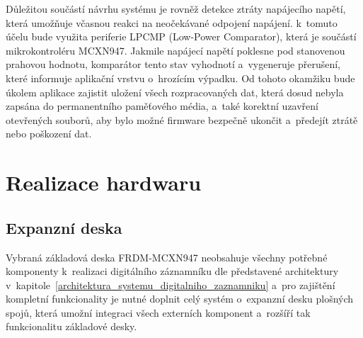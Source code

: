 Důležitou součástí návrhu systému je rovněž detekce ztráty napájecího napětí, která umožňuje včasnou reakci na neočekávané odpojení napájení. k~tomuto účelu bude využita periferie LPCMP (Low-Power Comparator), která je součástí mikrokontroléru MCXN947. Jakmile napájecí napětí poklesne pod stanovenou prahovou hodnotu, komparátor tento stav vyhodnotí a~vygeneruje přerušení, které informuje aplikační vrstvu o~hrozícím výpadku. Od tohoto okamžiku bude úkolem aplikace zajistit uložení všech rozpracovaných dat, která dosud nebyla zapsána do permanentního paměťového média, a~také korektní uzavření otevřených souborů, aby bylo možné firmware bezpečně ukončit a~předejít ztrátě nebo poškození dat.







\chapter{Realizace hardwaru}
\label{realizace_hardwaru}

\section{Expanzní deska}
\label{expanzni_deska}
Vybraná základová deska FRDM-MCXN947 neobsahuje všechny potřebné komponenty k~realizaci digitálního záznamníku dle představené architektury v~kapitole~\ref{architektura_systemu_digitalniho_zaznamniku} a~pro zajištění kompletní funkcionality je nutné doplnit celý systém o~expanzní desku plošných spojů, která umožní integraci všech externích komponent a~rozšíří tak funkcionalitu základové desky.

